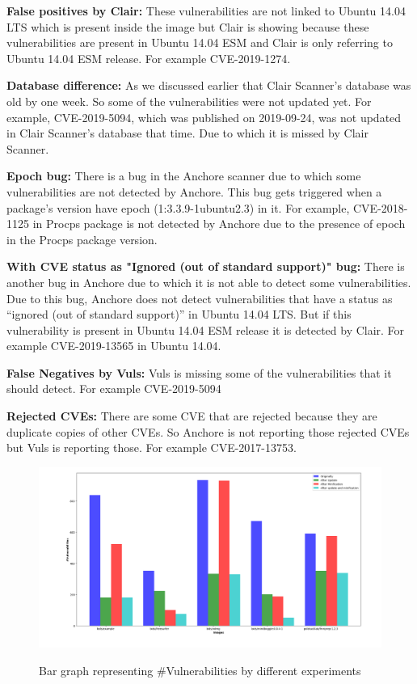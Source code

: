 \documentclass[a4paper,num-refs]{oup-contemporary}
\begin{document}
\textbf{False positives by Clair:} These vulnerabilities are not linked to Ubuntu 14.04 LTS which is 
present inside the image but Clair is showing because these vulnerabilities are present in Ubuntu 14.04 ESM and 
Clair is only referring to Ubuntu 14.04 ESM release. For example CVE-2019-1274.

\textbf{Database difference:} As we discussed earlier that Clair Scanner's database was old by one week.
                So some of the vulnerabilities were not updated yet. For example, CVE-2019-5094, which
		was published on 2019-09-24, was not 
		updated in Clair Scanner's database that time. Due to which it is missed by Clair Scanner.


\textbf{Epoch bug:} There is a bug in the Anchore scanner due to which some vulnerabilities are 
		not detected by Anchore. This bug gets triggered when a package’s version have epoch 
		(1:3.3.9-1ubuntu2.3) in it. For example, CVE-2018-1125 in Procps package is not
		detected by Anchore due to the presence of epoch in the Procps package version.

\textbf{With CVE status as "Ignored (out of standard support)" bug:} There is another bug in Anchore due to 
		which it is not able to detect some vulnerabilities. Due to this bug, Anchore does not detect 
		vulnerabilities that have a status as “ignored (out of standard support)” in Ubuntu 14.04 LTS. 
		But if this vulnerability is present in Ubuntu 14.04 ESM release it is detected by Clair. 
		For example CVE-2019-13565 in Ubuntu 14.04.


\textbf{False Negatives by Vuls:} Vuls is missing some of the vulnerabilities that it should detect. 
		For example CVE-2019-5094

\textbf{Rejected CVEs:} There are some CVE that are rejected because they are duplicate copies of other CVEs. 
	So Anchore is not reporting those rejected CVEs but Vuls is reporting those. For example CVE-2017-13753.

\begin{figure}[b]
        {\includegraphics[scale=1.5,width=\textwidth]
        {Figures/bargraph.png}}
        \caption{\label{fig:bargraph} Bar graph representing \#Vulnerabilities by different experiments}
      \end{figure}
\end{document}
